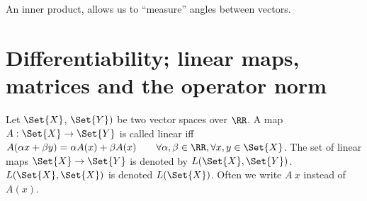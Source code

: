 \begin{rem}
 An inner product, allows us to ``measure'' angles between vectors.
\end{rem}
\section[Differentiability]{Differentiability; linear maps, matrices and the operator norm}
\begin{defn}
 Let $\Set{X}$, $\Set{Y})$ be two vector spaces over $\RR$. A map $A:\Set{X}\to\Set{Y}$ is called linear iff $A(\alpha x+\beta y)=\alpha A(x)+\beta A(x)\qquad \forall \alpha, \beta\in\RR, \forall x,y\in\Set{X}$. The set of linear maps $\Set{X}\to\Set{Y}$ is denoted by $L(\Set{X}, \Set{Y})$. $L(\Set{X},\Set{X})$ is denoted $L(\Set{X})$. Often we write $A\ x$ instead of $A(x)$. 
\end{defn}
